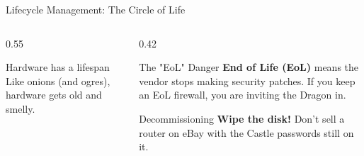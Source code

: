 \documentclass[aspectratio=169]{beamer}  %
\begin{document}
\begin{frame}{Lifecycle Management: The Circle of Life}
    \begin{columns}[T]
        \begin{column}{0.55\textwidth}
            \begin{block}{Hardware has a lifespan}
                \footnotesize
                Like onions (and ogres), hardware gets old and smelly.
            \end{block}
            \begin{center}
            \end{center}
        \end{column}
        \begin{column}{0.42\textwidth}
            \begin{alertblock}{The "EoL" Danger}
                \footnotesize
                \textbf{End of Life (EoL)} means the vendor stops making security patches.
                If you keep an EoL firewall, you are inviting the Dragon in.
            \end{alertblock}
            \begin{exampleblock}{Decommissioning}
                \footnotesize
                \textbf{Wipe the disk!} Don't sell a router on eBay with the Castle passwords still on it.
            \end{exampleblock}
        \end{column}
    \end{columns}
\end{frame}
\end{document}
